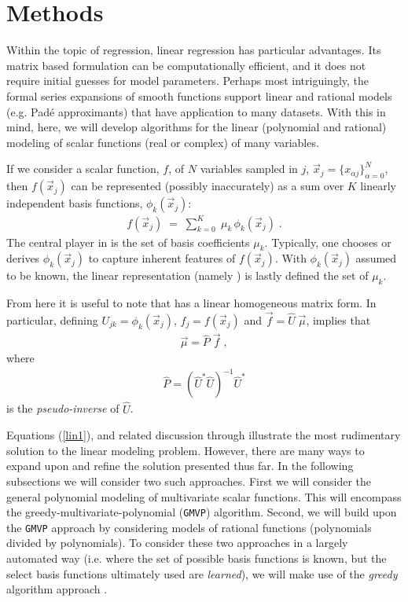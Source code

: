 \documentclass[twocolumn,aps,prd,floatfix,preprintnumbers,a4paper,nofootinbib,
superscriptaddress,10pt]{revtex4-1}
\def\gmvp#1{greedy-multivariate-polynomial#1
  (\texttt{GMVP}#1)\gdef\gmvp{\texttt{GMVP}}}
\begin{document}
\section{Methods}
\label{meth}
%
Within the topic of regression, linear regression has particular advantages.
%
Its matrix based formulation can be computationally efficient, and it does not require initial guesses for model parameters.
%
Perhaps most intriguingly, the formal series expansions of smooth functions support linear and rational models (e.g. Pad\'e approximants) that have application to many datasets.
%
With this in mind, here, we will develop algorithms for the linear (polynomial and rational) modeling of scalar functions (real or complex) of many variables.
%
\par If we consider a scalar function, $f$, of $N$ variables sampled in $j$, $\vec{x}_j = \{x_{\alpha j}\}_{\alpha=0}^{N}$, then $f(\vec{x}_j)$ can be represented (possibly inaccurately) as a sum over $K$ linearly independent basis functions, $\phi_k(\vec{x}_j)$:
%
\begin{align}
  \label{lin1}
  f({\vec{x}}_j) \; = \; \sum_{k=0}^{K} \; \mu_{k} \, \phi_k(\vec{x}_j)\; .
\end{align}
%
The central player in  is the set of basis coefficients $\mu_{k}$.
%
Typically, one chooses or derives $\phi_{k}(\vec{x}_j)$ to capture inherent features of $f(\vec{x}_j)$.
%
With $\phi_{k}(\vec{x}_j)$ assumed to be known, the linear representation (namely ) is lastly defined the set of $\mu_k$.
%
\def\vecmu{\vec{\mu}}
\def\vecf{\vec{f}}
\def\hatU{\hat{U}}
\def\hatP{\hat{P}}
%
\par From here it is useful to note that  has a linear homogeneous matrix form.
%
In particular, defining ${U}_{jk} = \phi_k(\vec{x}_j)$, $f_j = f(\vec{x}_j)$ and $\vec{f} = \hat{U} \; \vec{\mu}$, implies that
%
\begin{align}
  \label{eq:linsol1}
  \vecmu = \hatP \; \vecf \; ,
\end{align}
%
where
%
\begin{align}
  \label{pinv1}
  \hatP = \left( \hatU^{*} \hatU \right)^{-1}\hatU^{*}
\end{align}
%
is the \textit{pseudo-inverse} \cite{Moore1920,Penrose:1955} of $\hatU$.
%
\par Equations (\ref{lin1}), and related discussion through  illustrate the most rudimentary solution to the linear modeling problem.
%
However, there are many ways to expand upon and refine the solution presented thus far.
%
In the following subsections we will consider two such approaches.
%
First we will consider the general polynomial modeling of multivariate scalar functions.
%
This will encompass the \gmvp{} algorithm.
%
Second, we will build upon the \gmvp{} approach by considering models of rational functions (polynomials divided by polynomials).
%
To consider these two approaches in a largely automated way (i.e. where the set of possible basis functions is known, but the select basis functions ultimately used are \textit{learned}), we will make use of the \textit{greedy} algorithm approach \cite{Field:2011mf}.
%
\end{document}
